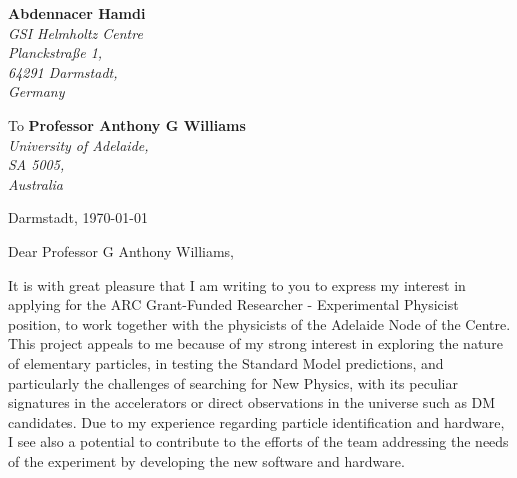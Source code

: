 \documentclass[11pt]{letter}
\begin{document}
 \sffamily
 \hfill
 \begin{flushleft}
 {\bfseries Abdennacer Hamdi}\\[.35ex]
 \small\itshape
 GSI Helmholtz Centre\\
 Planckstraße 1,\\
 64291 Darmstadt,\\
 Germany\\ %
 \end{flushleft}
 \begin{flushleft}
 To {\bfseries Professor Anthony G Williams}\\[.35ex]
 \small\itshape
 University of Adelaide, \\
 SA 5005, \\
 Australia

 \end{flushleft}
 \hfill
 \begin{flushleft}
 Darmstadt, \today \\
 
 \end{flushleft}
\par Dear Professor G Anthony Williams,
~\par It is with great pleasure that I am writing to you to express my interest in applying for the ARC Grant-Funded Researcher - Experimental Physicist position, to work together with the physicists of the Adelaide Node of the Centre. This project appeals to me because of my strong interest in exploring the nature of elementary particles, in testing the Standard Model predictions, and particularly the challenges of searching for New Physics, with its peculiar signatures in the accelerators or direct observations in the universe such as DM candidates. Due to my experience regarding particle identification and hardware, I see also a potential to contribute to the efforts of the team addressing the needs of the experiment by developing the new software and hardware.
\end{document}
